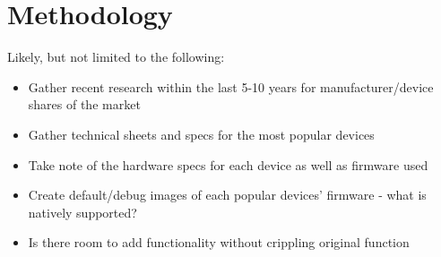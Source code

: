 \section{Methodology}
Likely, but not limited to the following:
\begin{itemize}
  \item Gather recent research within the last 5-10 years for manufacturer/device shares of the market
  \item Gather technical sheets and specs for the most popular devices
  \item Take note of the hardware specs for each device as well as firmware used
  \item Create default/debug images of each popular devices' firmware - what is natively supported?
  \item Is there room to add functionality without crippling original function
\end{itemize}
